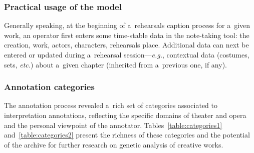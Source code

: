 \documentclass[conference]{IEEEtran}
\newcommand{\todo}[1]{\noindent\textcolor{red}{{\bf \{ToDo} #1{\bf \}}}}
\begin{document}
\subsubsection{Practical usage of the model} Generally speaking, at the beginning of a~rehearsals caption process for a~given work, an operator first enters some time-stable data in the note-taking tool: the creation, work, actors, characters, rehearsals place. Additional data can next be entered or updated during a~rehearsal session---\emph{e.g.}, contextual data (costumes, sets, \emph{etc.}) about a~given chapter (inherited from a~previous one, if any).

\subsubsection{Annotation categories}

The annotation process revealed a~rich set of categories associated to interpretation annotations, reflecting 
the  specific domains of theater and opera and the personal viewpoint of the annotator. Tables~\ref{table:categories1} and~\ref{table:categories2} present the richness of these categories and the potential of the archive for further research on genetic analysis of creative works.
\end{document}
